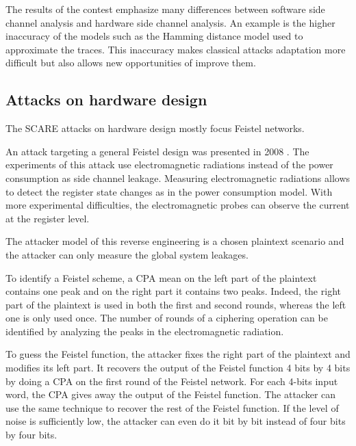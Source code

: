 \documentclass[11pt]{sdm}
\begin{document}
The results of the contest emphasize many differences between software side channel analysis and hardware side channel analysis.
An example is the higher inaccuracy of the models such as the Hamming distance model used to approximate the traces.
This inaccuracy makes classical attacks adaptation more difficult but also allows new opportunities of improve them.



\subsection{Attacks on hardware design}

The SCARE attacks on hardware design mostly focus Feistel networks.

An attack targeting a general Feistel design was presented in 2008 \parencite{Réal_Dubois_Guilloux_Valette_Drissi_2008}.
The experiments of this attack use electromagnetic radiations instead of the power consumption as side channel leakage.
Measuring electromagnetic radiations allows to detect the register state changes as in the power consumption model.
With more experimental difficulties, the electromagnetic probes can observe the current at the register level.

The attacker model of this reverse engineering is a chosen plaintext scenario and the attacker can only measure the global system leakages.

To identify a Feistel scheme, a CPA mean on the left part of the plaintext contains one peak and on the right part it contains two peaks.
Indeed, the right part of the plaintext is used in both the first and second rounds, whereas the left one is only used once.
The number of rounds of a ciphering operation can be identified by analyzing the peaks in the electromagnetic radiation.

To guess the Feistel function, the attacker fixes the right part of the plaintext and modifies its left part.
It recovers the output of the Feistel function 4 bits by 4 bits by doing a CPA on the first round of the Feistel network.
For each 4-bits input word, the CPA gives away the output of the Feistel function.
The attacker can use the same technique to recover the rest of the Feistel function.
If the level of noise is sufficiently low, the attacker can even do it bit by bit instead of four bits by four bits.
\end{document}

